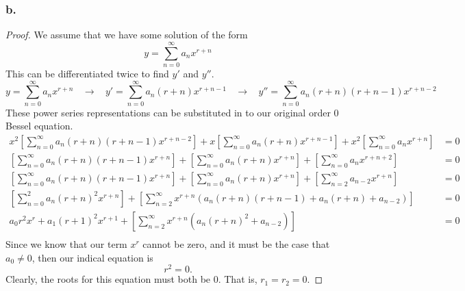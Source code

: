 \documentclass{article}
\theoremstyle{definition}
\begin{document}
        \subsubsection*{b.}
            \begin{proof}
                We assume that we have some solution of the form
                \[
                y = \sum_{n=0}^\infty a_n x^{r+n}
                \] 
                This can be differentiated twice to find $y'$ and $y''$.                
                \[
                y = \sum_{n=0}^\infty a_n x^{r+n} \ \ \ \ \longrightarrow \ \ \ \ y' = \sum_{n=0}^{\infty} a_n (r+n) x^{r+n-1} \ \ \ \ \longrightarrow \ \ \ \ y'' = \sum_{n=0}^{\infty} a_n (r+n) (r + n - 1) x^{r + n - 2} 
            \] 
            These power series representations can be substituted in to our original order 0 Bessel equation.
            \begin{align*}
                x^2 \left[
                    \sum_{n=0}^{\infty} a_n (r+n) (r + n - 1) x^{r + n - 2}
                \right] + x \left[
                    \sum_{n=0}^{\infty} a_n (r+n) x^{r+n-1}
                \right] + x^2 \left[
                    \sum_{n=0}^\infty a_n x^{r+n}
                \right] &= 0 \\
                \left[
                    \sum_{n=0}^{\infty} a_n (r+n) (r + n - 1) x^{r + n}
                \right] + \left[
                    \sum_{n=0}^{\infty} a_n (r+n) x^{r+n}
                \right] + \left[
                    \sum_{n=0}^\infty a_n x^{r+n+2}
                \right] &= 0 \\
                \left[
                    \sum_{n=0}^{\infty} a_n (r+n) (r + n - 1) x^{r + n}
                \right] + \left[
                    \sum_{n=0}^{\infty} a_n (r+n) x^{r+n}
                \right] + \left[
                    \sum_{n=2}^\infty a_{n-2} x^{r+n}
                \right] &= 0 \\
                \left[
                    \sum_{n=0}^{2} a_n (r+n)^2 x^{r + n}
                \right] + \left[
                    \sum_{n=2}^\infty x^{r+n}(a_n(r+n)(r+n-1) + a_n(r+n) + a_{n-2})
                \right] &= 0 \\
                a_0 r^2 x^r + a_1 (r+1)^2 x^{r+1} + \left[
                    \sum_{n=2}^\infty x^{r+n}(a_n(r+n)^2 + a_{n-2})
                \right] &= 0 \\
            \end{align*}
            Since we know that our term $x^r$ cannot be zero, and it must be the case that $a_0 \neq 0$, then our indical equation is 
            \[
                r^2 = 0
            .\]
            Clearly, the roots for this equation must both be 0.
            That is, $r_1 = r_2 = 0$.
            \end{proof}
\end{document}
